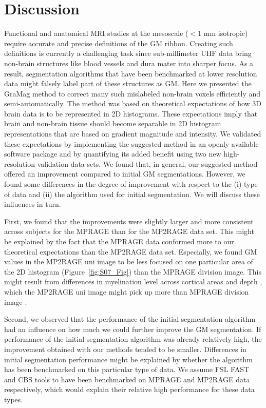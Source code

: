 \section{Discussion}
\label{sec:Discussion}
Functional and anatomical MRI studies at the mesoscale ($< 1$ mm isotropic) require accurate and precise definitions of the GM ribbon. Creating such definitions is currently a challenging task since sub-millimeter UHF data bring non-brain structures like blood vessels and dura mater into sharper focus. As a result, segmentation algorithms that have been benchmarked at lower resolution data might falsely label part of these structures as GM. Here we presented the GraMag method to correct many such mislabeled non-brain voxels efficiently and semi-automatically. The method was based on theoretical expectations of how 3D brain data is to be represented in 2D histograms. These expectations imply that brain and non-brain tissue should become separable in 2D histogram representations that are based on gradient magnitude and intensity. We validated these expectations by implementing the suggested method in an openly available software package and by quantifying its added benefit using two new high-resolution validation data sets. We found that, in general, our suggested method offered an improvement compared to initial GM segmentations. However, we found some differences in the degree of improvement with respect to the (i) type of data and (ii) the algorithm used for initial segmentation. We will discuss these influences in turn.

First, we found that the improvements were slightly larger and more consistent across subjects for the MPRAGE than for the MP2RAGE data set. This might be explained by the fact that the MPRAGE data conformed more to our theoretical expectations than the MP2RAGE data set. Especially, we found GM values in the MP2RAGE uni image to be less focused on one particular area of the 2D histogram (Figure~\ref{fig:S07_Fig}) than the MPRAGE division image. This might result from differences in myelination level across cortical areas and depth \parencite{Sereno2013, Dick2012, DeMartino2015myelin}, which the MP2RAGE uni image might pick up more than MPRAGE division image \parencite{Marques2013}.

Second, we observed that the performance of the initial segmentation algorithm had an influence on how much we could further improve the GM segmentation. If performance of the initial segmentation algorithm was already relatively high, the improvement obtained with our methods tended to be smaller. Differences in initial segmentation performance might be explained by whether the algorithm has been benchmarked on this particular type of data. We assume FSL FAST and CBS tools to have been benchmarked on MPRAGE and MP2RAGE data respectively, which would explain their relative high performance for these data types.

